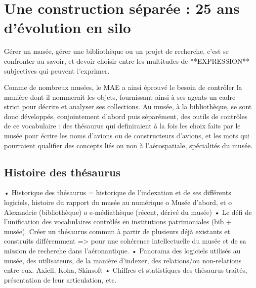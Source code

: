 \section{\label{II-A-1}Une construction séparée : 25 ans d'évolution en silo}


Gérer un musée, gérer une bibliothèque ou un projet de recherche, c'est se confronter au savoir, et devoir choisir entre les multitudes de **EXPRESSION** subjectives qui peuvent l'exprimer.
 
Comme de nombreux musées, le MAE a ainsi éprouvé le besoin de contrôler la manière dont il nommerait les objets, fournissant ainsi à ses agents un cadre strict pour décrire et analyser ses collections. Au musée, à la bibliothèque, se sont donc développés, conjointement d'abord puis séparément, des outils de contrôles de ce vocabulaire : des thésaurus qui definiraient à la fois les choix faits par le musée pour écrire les noms d'avions ou de constructeurs d'avions, et les mots qui pourraient qualifier des concepts liés ou non à l'aérospatiale, spécialités du musée. 

\subsection{Histoire des thésaurus} 

• Historique des thésaurus = historique de l’indexation et de ses différents 
logiciels, histoire du rapport du musée au numérique
o Musée d’abord, et 
o Alexandrie (bibliothèque)
o e-médiathèque (récent, dérivé du musée)
• Le défi de l’unification des vocabulaires contrôlés en institutions patrimoniales 
(bib + musée). Créer un thésaurus commun à partir de plusieurs déjà existants et 
construits différemment => pour une cohérence intellectuelle du musée et de sa 
mission de recherche dans l’aéronautique.
• Panorama des logiciels utilisés au musée, des utilisateurs, de la manière 
d’indexer, des relations/ou non-relations entre eux. Axiell, Koha, Skinsoft
• Chiffres et statistiques des thésaurus traités, présentation de leur articulation, 
etc.